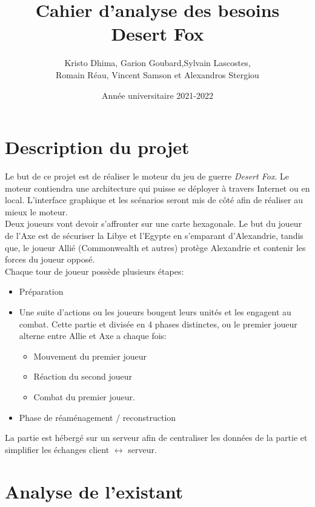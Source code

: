 \documentclass{article}[a4paper, 12pt]
\title{\LARGE \textbf{Cahier d’analyse des besoins } \\ \Large \textbf{Desert Fox}}
\author{Kristo Dhima, Garion Goubard,Sylvain Lascostes, \\Romain Réau, Vincent Samson et Alexandros Stergiou }
\date{Année universitaire 2021-2022}
\begin{document}
\maketitle

\tableofcontents %

\newpage

\section{Description du projet}

Le but de ce projet est de réaliser le moteur du jeu de guerre \emph{Desert Fox}. Le moteur contiendra une architecture qui puisse se déployer à travers Internet ou en local. L'interface graphique et les scénarios seront mis de côté afin de réaliser au mieux le moteur.\\

Deux joueurs vont devoir s'affronter sur une carte hexagonale. Le but du joueur de l'Axe est de sécuriser la Libye et l'Egypte en s'emparant d'Alexandrie, tandis que, le joueur Allié (Commonwealth et autres) protège Alexandrie et contenir les forces du joueur opposé.\\

Chaque tour de joueur possède plusieurs étapes:
\begin{itemize}
    \item Préparation
    \item Une suite d'actions ou les joueurs bougent leurs unités et les engagent au combat. Cette partie et divisée en 4 phases distinctes, ou le premier joueur alterne entre Allie et Axe a chaque fois:
    \begin{itemize}
        \item Mouvement du premier joueur
        \item Réaction du second joueur
        \item Combat du premier joueur.
    \end{itemize}
    \item Phase de réaménagement / reconstruction
\end{itemize}

La partie est hébergé sur un serveur afin de centraliser les données de la partie et simplifier les échanges client $\leftrightarrow$ serveur.

\section{Analyse de l'existant}
\end{document}
